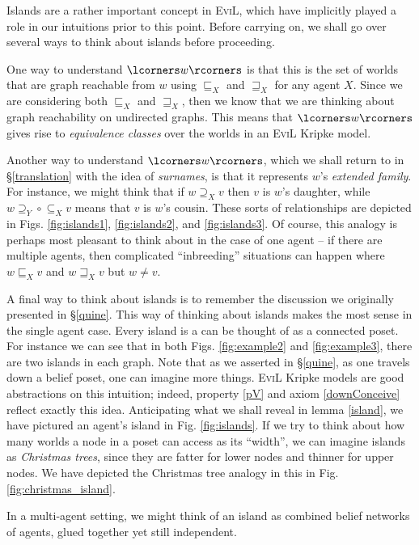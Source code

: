 Islands are a rather important concept in \textsc{EviL}, which have
implicitly played a role in our intuitions prior to this point.
Before carrying on, we shall go over several ways to think about islands
before proceeding. 
\begin{myroman}
\item One way to understand $\lcorners w \rcorners$ is that this is the set
of worlds that are graph reachable from $w$ using $\sqsubseteq_X$ and
$\sqsupseteq_X$ for any agent $X$.  Since we are considering both
$\sqsubseteq_X$ and $\sqsupseteq_X$, then we know that we are thinking
about graph reachability on undirected graphs.
  This means that $\lcorners w
\rcorners$ gives rise to \emph{equivalence classes} over the worlds in
an \textsc{EviL} Kripke model.

\item Another way to understand $\lcorners w \rcorners$, which we shall
return to in \S\ref{translation} with the idea of \emph{surnames}, 
is that it represents $w$'s
\emph{extended family}.  
For instance, we might think that if $w
\supseteq_X v$ then $v$ is $w$'s daughter, while $w \supseteq_Y \circ
\subseteq_X v$ means that $v$ is $w$'s cousin.  These sorts of
relationships are depicted in Figs. \ref{fig:islands1},
\ref{fig:islands2}, and \ref{fig:islands3}.  Of course, this
analogy is perhaps most pleasant to think about 
in the case of one agent -- if there
are multiple agents, then complicated ``inbreeding'' situations 
can happen where $w \sqsubseteq_X v$ and $w \sqsupseteq_X v$ 
but $w \neq v$.

\item\label{thirdway} 
  A final way to think about islands is to remember the discussion
  we originally presented in \S\ref{quine}.  This way of thinking
  about islands makes the most sense in the single agent case.
  Every island is a can be thought of as a connected poset.  For
  instance we can see that in both Figs. \ref{fig:example2}  and
  \ref{fig:example3}, there are two islands in each graph.
Note that as we asserted in \S\ref{quine}, as one travels down a
belief poset, one can imagine more things.  \textsc{EviL} Kripke
models are good abstractions on this intuition; indeed, property \ref{pV}
and axiom \ref{downConceive} reflect exactly this idea.
Anticipating what we shall reveal in lemma \ref{island}, we have
pictured  an agent's island in Fig. \ref{fig:islands}.  If we try to
think about how many worlds a node in a poset can access as its
``width'', we can imagine islands as \emph{Christmas trees}, since
they are fatter for lower nodes and thinner for upper nodes. 
We have depicted the Christmas tree analogy in this in Fig. \ref{fig:christmas_island}.

  In a multi-agent setting, we might think of an island as combined belief
  networks of agents, glued together yet still independent.
\end{myroman}

